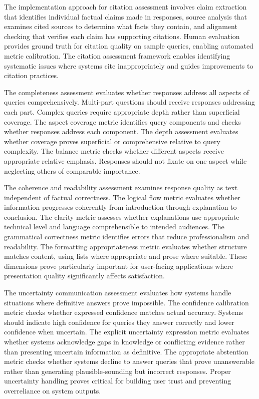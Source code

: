 The implementation approach for citation assessment involves claim extraction that identifies individual factual claims made in responses, source analysis that examines cited sources to determine what facts they contain, and alignment checking that verifies each claim has supporting citations. Human evaluation provides ground truth for citation quality on sample queries, enabling automated metric calibration. The citation assessment framework enables identifying systematic issues where systems cite inappropriately and guides improvements to citation practices.

The completeness assessment evaluates whether responses address all aspects of queries comprehensively. Multi-part questions should receive responses addressing each part. Complex queries require appropriate depth rather than superficial coverage. The aspect coverage metric identifies query components and checks whether responses address each component. The depth assessment evaluates whether coverage proves superficial or comprehensive relative to query complexity. The balance metric checks whether different aspects receive appropriate relative emphasis. Responses should not fixate on one aspect while neglecting others of comparable importance.

The coherence and readability assessment examines response quality as text independent of factual correctness. The logical flow metric evaluates whether information progresses coherently from introduction through explanation to conclusion. The clarity metric assesses whether explanations use appropriate technical level and language comprehensible to intended audiences. The grammatical correctness metric identifies errors that reduce professionalism and readability. The formatting appropriateness metric evaluates whether structure matches content, using lists where appropriate and prose where suitable. These dimensions prove particularly important for user-facing applications where presentation quality significantly affects satisfaction.

The uncertainty communication assessment evaluates how systems handle situations where definitive answers prove impossible. The confidence calibration metric checks whether expressed confidence matches actual accuracy. Systems should indicate high confidence for queries they answer correctly and lower confidence when uncertain. The explicit uncertainty expression metric evaluates whether systems acknowledge gaps in knowledge or conflicting evidence rather than presenting uncertain information as definitive. The appropriate abstention metric checks whether systems decline to answer queries that prove unanswerable rather than generating plausible-sounding but incorrect responses. Proper uncertainty handling proves critical for building user trust and preventing overreliance on system outputs.

